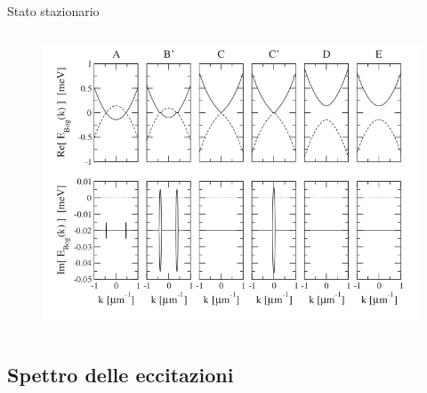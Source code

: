 \documentclass[10pt]{beamer}
\begin{document}
\begin{frame}{Stato stazionario}
\begin{columns}[t]
 \begin{column}{.5\textwidth}
  \begin{figure}
   \includegraphics[width=\columnwidth]{pics/Spectra.png}
  \end{figure}
 \end{column}

\end{columns}


\end{frame}

\subsection{Spettro delle eccitazioni}
\end{document}
